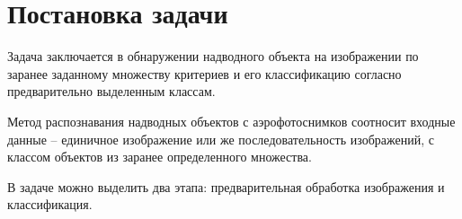 \chapter{Постановка задачи}

Задача заключается в обнаружении надводного объекта на изображении по заранее заданному множеству критериев и его классификацию согласно предварительно выделенным классам.

Метод распознавания надводных объектов с аэрофотоснимков соотносит входные данные -- единичное изображение или же последовательность изображений, с классом объектов из заранее определенного множества.

В задаче можно выделить два этапа: предварительная обработка изображения и классификация.
